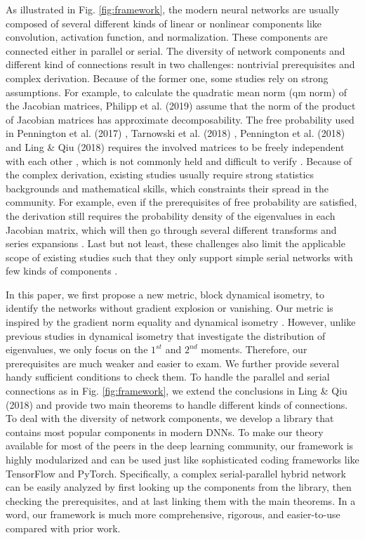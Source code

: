 \documentclass[10pt,journal,compsoc]{IEEEtran}
\begin{document}
{As illustrated in Fig. \ref{fig:framework}, the modern neural networks are usually composed of several different kinds of linear or nonlinear components like convolution, activation function, and normalization. These components are connected either in parallel or serial. The diversity of network components and different kind of connections result in two challenges: nontrivial prerequisites and complex derivation. Because of the former one, some studies rely on strong assumptions. For example, to calculate the quadratic mean norm (qm norm) of the Jacobian matrices, Philipp et al. (2019) \cite{philipp2018gradients} assume that the norm of the product of Jacobian matrices has approximate decomposability. The free probability used in Pennington et al. (2017) \cite{pennington2017resurrecting}, Tarnowski et al. (2018) \cite{tarnowski2018dynamical}, Pennington et al. (2018) \cite{pennington2018emergence} and Ling \& Qiu (2018) \cite{ling2018spectrum} requires the involved matrices to be freely independent with each other \cite{mingo2017free}, which is not commonly held and difficult to verify \cite{chen2012partial}. Because of the complex derivation, existing studies usually require strong statistics backgrounds and mathematical skills, which constraints their spread in the community. For example, even if the prerequisites of free probability are satisfied, the derivation still requires the probability density of the eigenvalues in each Jacobian matrix, which will then go through several different transforms and series expansions \cite{ling2018spectrum}. Last but not least, these challenges also limit the applicable scope of existing studies such that they only support simple serial networks with few kinds of components \cite{he2015delving,poole2016exponential,xiao2018dynamical,yang2019mean,schoenholz2016deep,arpit2019benefits}.

In this paper, we first propose a new metric, block dynamical isometry, to identify the networks without gradient explosion or vanishing. Our metric is inspired by the gradient norm equality \cite{arpit2019benefits} and dynamical isometry \cite{ling2018spectrum}. However, unlike previous studies in dynamical isometry that investigate the distribution of eigenvalues, we only focus on the $1^{st}$ and $2^{nd}$ moments. Therefore, our prerequisites are much weaker and easier to exam. We further provide several handy sufficient conditions to check them. To handle the parallel and serial connections as in Fig. \ref{fig:framework}, we extend the conclusions in Ling \& Qiu (2018) \cite{ling2018spectrum} and provide two main theorems to handle different kinds of connections. To deal with the diversity of network components, we develop a library that contains most popular components in modern DNNs. To make our theory available for most of the peers in the deep learning community, our framework is highly modularized and can be used just like sophisticated coding frameworks like TensorFlow and PyTorch. Specifically, a complex serial-parallel hybrid network can be easily analyzed by first looking up the components from the library, then checking the prerequisites, and at last linking them with the main theorems. In a word, our framework is much more comprehensive, rigorous, and easier-to-use compared with prior work.}
\end{document}
